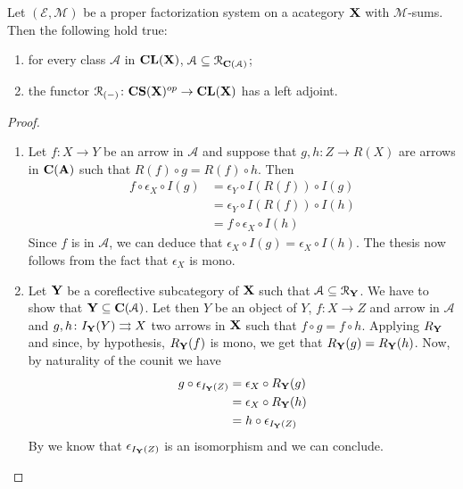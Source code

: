 \documentclass[a4paper,UKenglish,cleveref,pdftex,thm-restate,numberwithinsect]{lipics-v2021}
\newcommand{\cori}{\mathbf{CS}}
\newcommand{\cla}{\mathbf{CL}}
\def\A{\textbf {\textup{A}}}
\def\C{\textbf {\textup{C}}}
\def\X{\textbf {\textup{X}}}
\def\Y{\textbf {\textup{Y}}}
\begin{document}
\begin{proposition}Let $(\mathcal{E}, \mathcal{M})$ be a proper factorization system on a acategory $\X$ with $\mathcal{M}$-sums. Then the following hold true:
	\begin{enumerate}
		\item for every class $\mathcal{A}$ in $\cla(\X)$, $\mathcal{A}\subseteq \mathcal{R}_{\C(\mathcal{A})}$;
		\item the functor $\mathcal{R}_{(-)}\colon \cori(\X )^{op}\to \cla(\X)$ has a left adjoint.
	\end{enumerate} 
\end{proposition}
\begin{proof}\begin{enumerate}
		\item Let $f\colon X\to Y$ be an arrow in $\mathcal{A}$ and suppose that $g,h\colon Z\to R(X)$ are arrows in $\C(\A)$ such that $R(f)\circ g=R(f)\circ h$. Then
		\begin{align*}
			f\circ \epsilon_X\circ I(g)&=\epsilon_Y\circ I(R(f))\circ I(g)\\&=
			\epsilon_Y\circ I(R(f))\circ I(h)\\&=f\circ \epsilon_X\circ I(h)
		\end{align*}
		Since $f$ is in $\mathcal{A}$, we can deduce that $\epsilon_X\circ I(g)=\epsilon_X\circ I(h)$. The thesis now follows from the fact that $\epsilon_X$ is mono.
		
		\item Let $\Y$ be a coreflective subcategory of $\X$ such that $\mathcal{A}\subseteq \mathcal{R}_\Y$. We have to show that $\Y\subseteq \C(\mathcal{A})$. Let then $Y$ be an object of $Y$, $f\colon X\to Z$ and arrow in $\mathcal{A}$ and $g, h\colon I_\Y(Y)\rightrightarrows X$ two arrows in $\X$ such that $f\circ g=f\circ h$. Applying $R_\Y$ and since, by hypothesis, $R_\Y(f)$ is mono, we get that $R_\Y(g)=R_\Y(h)$. Now, by naturality of the counit we have
	\begin{align*}g\circ \epsilon_{I_\Y(Z)}&=\epsilon_X\circ R_\Y(g)\\&=\epsilon_X\circ R_\Y(h)\\&=h\circ \epsilon_{I_\Y(Z)}
	\end{align*}
	By   we know that $\epsilon_{I_\Y(Z)}$ is an isomorphism and we can conclude. \qedhere 
	\end{enumerate}
\end{proof}
\end{document}
